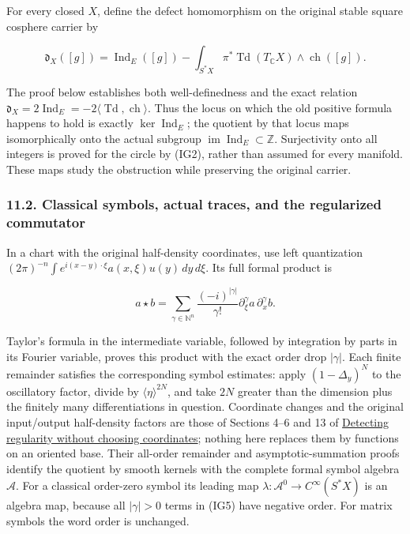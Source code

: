 \documentclass[
  11pt,
]{article}
\begin{document}
For every closed \(X\), define the defect homomorphism on the original
stable square cosphere carrier by

\[
 \mathfrak d_X([g])=
 \operatorname{Ind}_E([g])-
 \int_{S^*X}\pi^*\operatorname{Td}(T_{\mathbb C}X)
                    \wedge\operatorname{ch}([g]).
\tag{IG4}
\]

The proof below establishes both well-definedness and the exact relation
\(\mathfrak d_X=2\operatorname{Ind}_E=-2\langle\operatorname{Td},\operatorname{ch}\rangle\).
Thus the locus on which the old positive formula happens to hold is
exactly \(\ker\operatorname{Ind}_E\); the quotient by that locus maps
isomorphically onto the actual subgroup
\(\operatorname{im}\operatorname{Ind}_E\subset\mathbb Z\). Surjectivity
onto all integers is proved for the circle by (IG2), rather than assumed
for every manifold. These maps study the obstruction while preserving
the original carrier.

\subsubsection{11.2. Classical symbols, actual traces, and the
regularized
commutator}\label{classical-symbols-actual-traces-and-the-regularized-commutator}

{\small\sloppy
In a chart with the original half-density coordinates, use left
quantization
\((2\pi)^{-n}\int e^{i(x-y)\cdot\xi}a(x,\xi)u(y)\,dy\,d\xi\). Its full
formal product is
\par}

\[
 a\star b=\sum_{\gamma\in\mathbb N^n}
       \frac{(-i)^{|\gamma|}}{\gamma!}
       \partial_\xi^\gamma a\,\partial_x^\gamma b.
\tag{IG5}
\]

Taylor's formula in the intermediate variable, followed by integration
by parts in its Fourier variable, proves this product with the exact
order drop \(|\gamma|\). Each finite remainder satisfies the
corresponding symbol estimates: apply \((1-\Delta_y)^N\) to the
oscillatory factor, divide by \(\langle\eta\rangle^{2N}\), and take
\(2N\) greater than the dimension plus the finitely many
differentiations in question. Coordinate changes and the original
input/output half-density factors are those of Sections 4--6 and 13 of
\href{geometric-microlocal-calculus.pdf}{Detecting regularity without
choosing coordinates}; nothing here replaces them by functions on an
oriented base. Their all-order remainder and asymptotic-summation proofs
identify the quotient by smooth kernels with the complete formal symbol
algebra \(\mathcal A\). For a classical order-zero symbol its leading
map \(\lambda:\mathcal A^0\to C^\infty(S^*X)\) is an algebra map,
because all \(|\gamma|>0\) terms in (IG5) have negative order. For
matrix symbols the word order is unchanged.
\end{document}
